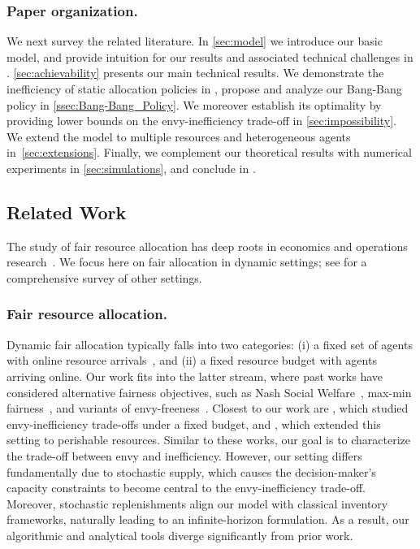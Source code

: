 \documentclass[mnsc,nonblindrev]{informs3}
\renewcommand{\paragraph}[1]{\subsubsection*{#1}}
\begin{document}
\paragraph{Paper organization.} We next survey the related literature.  In \cref{sec:model} we introduce our basic model, and provide intuition for our results and associated technical challenges in .  
\cref{sec:achievability} presents our main technical results.  We demonstrate the inefficiency of static allocation policies in , propose and analyze our Bang-Bang policy in \cref{ssec:Bang-Bang_Policy}. We moreover establish its optimality by providing lower bounds on the envy-inefficiency trade-off in \cref{sec:impossibility}. We extend the model to multiple resources and heterogeneous agents in~\cref{sec:extensions}. Finally, we complement our theoretical results with numerical experiments in \cref{sec:simulations}, and conclude in .
\subsection{Related Work}
\label{ssec:relwork}

The study of fair resource allocation has deep roots in economics and operations research~\citep{varian1973equity,rawls2017theory,scarf1957min}. We focus here on fair allocation in dynamic settings; see \citet{aleksandrov2019online} for a comprehensive survey of other settings.



\paragraph{Fair resource allocation.} Dynamic fair allocation typically falls into two categories: (i) a fixed set of agents with online resource arrivals~\citep{aleksandrov2015online,mattei2018fairness,gorokh2020fair,bansal2020online,bogomolnaia2022fair,ijcai2019-49,aziz2016control,zeng2019fairness,friedman_2017}, and (ii) a fixed resource budget with agents arriving online. Our work fits into the latter stream, where past works have considered alternative fairness objectives, such as Nash Social Welfare~\citep{azar2010allocate,gorokh2020fair}, max-min fairness~\citep{lien2014sequential,manshadi2021fair}, and variants of envy-freeness~\citep{friedman_2017,cole_2013,10.1145/2764468.2764495,freund2025fair}. Closest to our work are \citet{sinclair2021sequential}, which studied envy-inefficiency trade-offs under a fixed budget, and \citet{banerjee2024online}, which extended this setting to perishable resources.
Similar to these works, our goal is to characterize the trade-off between envy and inefficiency. However, our setting differs fundamentally due to stochastic supply, which causes the decision-maker's capacity constraints to become central to the envy-inefficiency trade-off. Moreover, stochastic replenishments align our model with classical inventory frameworks, naturally leading to an infinite-horizon formulation. As a result, our algorithmic and analytical tools diverge significantly from prior work.
\end{document}
